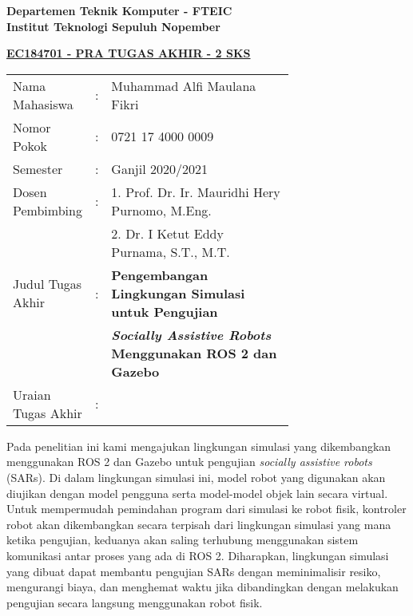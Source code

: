 \begin{flushleft}
  \textbf{Departemen Teknik Komputer - FTEIC}\\
  \textbf{Institut Teknologi Sepuluh Nopember}\\
\end{flushleft}

\begin{center}
  \underline{\textbf{EC184701 - PRA TUGAS AKHIR - 2 SKS}}
\end{center}

\begin{adjustwidth}{-0.2cm}{}
  \begin{tabular}{lcp{0.7\linewidth}}

    Nama Mahasiswa &:& Muhammad Alfi Maulana Fikri \\
    Nomor Pokok &:&	0721 17 4000 0009 \\

    Semester &:& Ganjil 2020/2021 \\

    Dosen Pembimbing &:& 1. Prof. Dr. Ir. Mauridhi Hery Purnomo, M.Eng. \\
    & & 2. Dr. I Ketut Eddy Purnama, S.T., M.T. \\

    Judul Tugas Akhir &:& \textbf{Pengembangan Lingkungan Simulasi untuk Pengujian} \\
    & & \textbf{\emph{Socially Assistive Robots} Menggunakan ROS 2 dan Gazebo} \\

    Uraian Tugas Akhir &:& \\
  \end{tabular}
\end{adjustwidth}

Pada penelitian ini kami mengajukan lingkungan simulasi yang dikembangkan menggunakan ROS 2 dan Gazebo untuk pengujian \emph{socially assistive robots} (SARs).
Di dalam lingkungan simulasi ini, model robot yang digunakan akan diujikan dengan model pengguna serta model-model objek lain secara virtual.
Untuk mempermudah pemindahan program dari simulasi ke robot fisik, kontroler robot akan dikembangkan secara terpisah dari lingkungan simulasi yang mana ketika pengujian, keduanya akan saling terhubung menggunakan sistem komunikasi antar proses yang ada di ROS 2.
Diharapkan, lingkungan simulasi yang dibuat dapat membantu pengujian SARs dengan meminimalisir resiko, mengurangi biaya, dan menghemat waktu jika dibandingkan dengan melakukan pengujian secara langsung menggunakan robot fisik.
\vspace{1ex}

